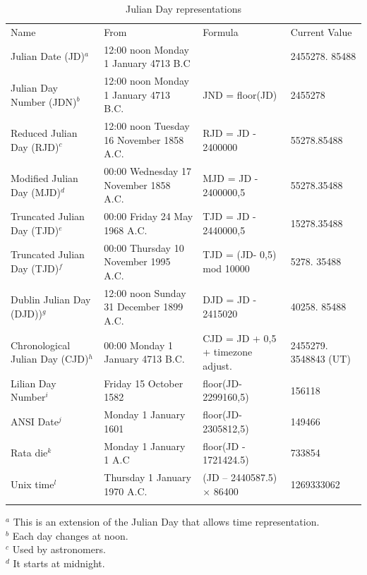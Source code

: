 \begin{table}
\caption{Julian Day representations}
\label{table:juliandayrepresentations}

\begin{tabular}{p{2cm}p{4cm}p{4cm}p{2cm}}
\hline\noalign{\smallskip}
Name & From & Formula & Current Value  \\ 
\noalign{\smallskip}\svhline\noalign{\smallskip}
Julian Date (JD)$^a$ & 12:00 noon Monday 1 January 4713 B.C & & 2455278. 85488  \\ 
Julian Day Number (JDN)$^b$ & 12:00 noon  Monday 1 January 4713 B.C. & JND = floor(JD) & 2455278 \\ 
Reduced Julian Day (RJD)$^c$ & 12:00 noon Tuesday 16 November 1858 A.C. & RJD = JD - 2400000 & 55278.85488  \\ 
Modified Julian Day (MJD)$^d$ & 00:00 Wednesday 17 November 1858 A.C. & MJD = JD - 2400000,5 & 55278.35488 \\ 
Truncated Julian Day (TJD)$^e$ & 00:00 Friday 24 May 1968 A.C. & TJD = JD - 2440000,5 & 15278.35488  \\ 
Truncated Julian Day (TJD)$^f$ & 00:00 Thursday 10 November 1995 A.C. & TJD = (JD- 0,5) mod 10000 & 5278. 35488   \\ 
Dublin Julian Day (DJD))$^g$ & 12:00 noon Sunday 31 December 1899 A.C. & DJD = JD - 2415020 & 40258. 85488 \\ 
Chronological Julian Day (CJD)$^h$  & 00:00 Monday 1 January 4713 B.C. & CJD = JD + 0,5 + timezone adjust. & 2455279. 3548843 (UT)  \\ 
Lilian Day Number$^i$ & Friday 15 October 1582 & floor(JD-2299160,5) & 156118 \\ 
ANSI Date$^j$  & Monday 1 January 1601 & floor(JD-2305812,5) & 149466  \\ 
Rata die$^k$  & Monday 1 January 1 A.C & floor(JD - 1721424.5) & 733854 \\ 
Unix time$^l$  & Thursday 1 January 1970 A.C. & (JD – 2440587.5) × 86400 & 1269333062 \\ 
\noalign{\smallskip}\hline\noalign{\smallskip}
\end{tabular}
$^a$ This is an extension of the Julian Day that allows time representation. \\
$^b$  Each day changes at noon. \\
$^c$  Used by astronomers. \\
$^d$ It starts at midnight. \\

\end{table}
